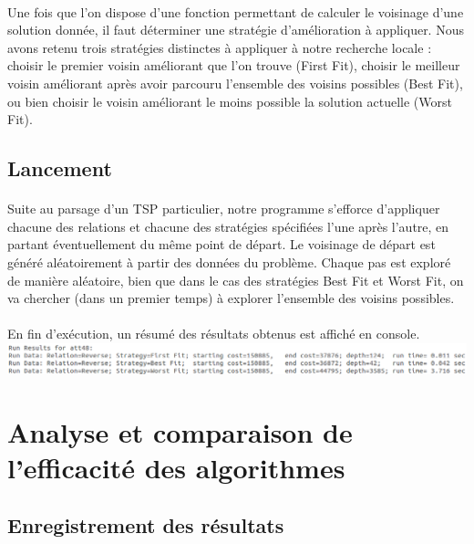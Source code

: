 \documentclass[a4paper,10pt]{report}
\begin{document}
\paragraph{}
  Une fois que l'on dispose d'une fonction permettant de calculer le voisinage d'une solution donnée, il faut déterminer
une stratégie d'amélioration à appliquer. Nous avons retenu trois stratégies distinctes à appliquer à notre recherche
locale : choisir le premier voisin améliorant que l'on trouve (First Fit), choisir le meilleur voisin améliorant après
avoir parcouru l'ensemble des voisins possibles (Best Fit), ou bien choisir le voisin améliorant le moins possible la
solution actuelle (Worst Fit).


\subsection{Lancement}

\paragraph{}
  Suite au parsage d'un TSP particulier, notre programme s'efforce d'appliquer chacune des relations et chacune
des stratégies spécifiées l'une après l'autre, en partant éventuellement du même point de départ. Le voisinage de
départ est généré aléatoirement à partir des données du problème. Chaque pas est exploré de manière aléatoire, bien
que dans le cas des stratégies Best Fit et Worst Fit, on va chercher (dans un premier temps) à explorer l'ensemble
des voisins possibles.

\paragraph{}
En fin d'exécution, un résumé des résultats obtenus est affiché en console.
\includegraphics[width=\textwidth]{images/exec-summary.png} 

\section{Analyse et comparaison de l'efficacité des algorithmes}
\subsection{Enregistrement des résultats}
\end{document}
